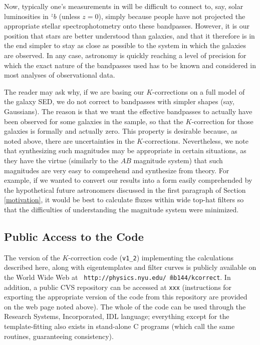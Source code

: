 \documentclass[10pt,preprint]{aastex}
\newcommand{\band}[2]{\ensuremath{^{#1}\!{#2}}}
\begin{document}
Now, typically one's measurements in will be difficult to connect to,
say, solar luminosities in $\band{z}{b}$ (unless $z=0$), simply
because people have not projected the appropriate stellar
spectrophotometry onto these bandpasses. However, it is our position
that stars are better understood than galaxies, and that it therefore
is in the end simpler to stay as close as possible to the system in
which the galaxies are observed. In any case, astronomy is quickly
reaching a level of precision for which the exact nature of the
bandpasses used has to be known and considered in most analyses of
observational data.

The reader may ask why, if we are basing our $K$-corrections on a full
model of the galaxy SED, we do not correct to bandpasses with simpler
shapes (say, Gaussians). The reason is that we want the effective
bandpasses to actually have been observed for some galaxies in the
sample, so that the $K$-correction for those galaxies is formally and
actually zero. This property is desirable because, as noted above,
there are uncertainties in the $K$-corrections. Nevertheless, we note
that synthesizing such magnitudes may be appropriate in certain
situations, as they have the virtue (similarly to the $AB$ magnitude
system) that such magnitudes are very easy to comprehend and
synthesize from theory. For example, if we wanted to convert our
results into a form easily comprehended by the hypothetical future
astronomers discussed in the first paragraph of Section
\ref{motivation}, it would be best to calculate fluxes within wide
top-hat filters so that the difficulties of understanding the
magnitude system were minimized.

\subsection{Public Access to the Code}

The version of the $K$-correction code ({\tt v1\_2}) implementing the
calculations described here, along with eigentemplates and filter
curves is publicly available on the World Wide Web at {\tt
http://physics.nyu.edu/\~\ mb144/kcorrect}. In addition, a public CVS
repository can be accessed at {\tt xxx} (instructions for exporting
the appropriate version of the code from this repository are provided
on the web page noted above). The whole of the code can be used
through the Research Systems, Incorporated, IDL language; everything
except for the template-fitting also exists in stand-alone C programs
(which call the same routines, guaranteeing consistency).
\end{document}
